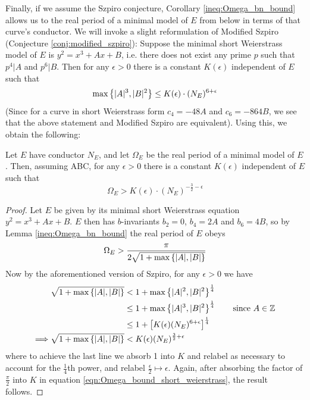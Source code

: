\documentclass[10pt]{article}
\begin{document}
Finally, if we assume the Szpiro conjecture, Corollary \ref{ineq:Omega_bn_bound} allows us to the real period of a minimal model of $E$ from below in terms of that curve's conductor. We will invoke a slight reformulation of Modified Szpiro (Conjecture \ref{conj:modified_szpiro}): Suppose the minimal short Weierstrass model of $E$ is $y^2 = x^3+Ax+B$, i.e. there does not exist any prime $p$ such that $p^4|A$ and $p^6|B$. Then for any $\epsilon>0$ there is a constant $K(\epsilon)$ independent of $E$ such that
\begin{equation}
\max\left\{|A|^3,|B|^2\right\} \le K(\epsilon)\cdot (N_E)^{6+\epsilon}
\end{equation}
(Since for a curve in short Weierstrass form $c_4 = -48A$ and $c_6=-864B$, we see that the above statement and Modified Szpiro are equivalent). Using this, we obtain the following:
\begin{proposition}
Let $E$ have conductor $N_E$, and let $\Omega_E$ be the real period of a minimal model of $E$. Then, assuming ABC, for any $\epsilon>0$ there is a constant $K(\epsilon)$ independent of $E$ such that 
\begin{equation}
\Omega_E > K(\epsilon) \cdot (N_E)^{-\frac{3}{2}-\epsilon}
\end{equation}
\end{proposition}
\begin{proof}
Let $E$ be given by its minimal short Weierstrass equation $y^2 = x^3+Ax+B$. $E$ then has $b$-invariants $b_2=0$, $b_4 = 2A$ and $b_6 = 4B$, so by Lemma \ref{ineq:Omega_bn_bound} the real period of $E$ obeys
\begin{equation}\label{eqn:Omega_bound_short_weierstrass}
\Omega_E > \frac{\pi}{2\sqrt{1+\max\left\{|A|,|B|\right\}}}
\end{equation}
Now by the aforementioned version of Szpiro, for any $\epsilon>0$ we have
\begin{align*}
\sqrt{1+\max\left\{|A|,|B|\right\}} &<  1 + \max\left\{|A|^2,|B|^2\right\}^\frac{1}{4} \\
&\le 1 + \max\left\{|A|^3,|B|^2\right\}^\frac{1}{4} \quad\quad\mbox{since $A \in \mathbb{Z}$} \\
&\le 1 +\left[K(\epsilon) (N_E)^{6+\epsilon} \right]^\frac{1}{4} \\
\Longrightarrow \sqrt{1+\max\left\{|A|,|B|\right\}} &< K(\epsilon) (N_E)^{\frac{3}{2}+\epsilon}
\end{align*}
where to achieve the last line we absorb 1 into $K$ and relabel as necessary to account for the $\frac{1}{4}$th power, and relabel $\frac{\epsilon}{2} \mapsto \epsilon$. Again, after absorbing the factor of $\frac{\pi}{2}$ into $K$ in equation \ref{eqn:Omega_bound_short_weierstrass}, the result follows.
\end{proof}
\end{document}
